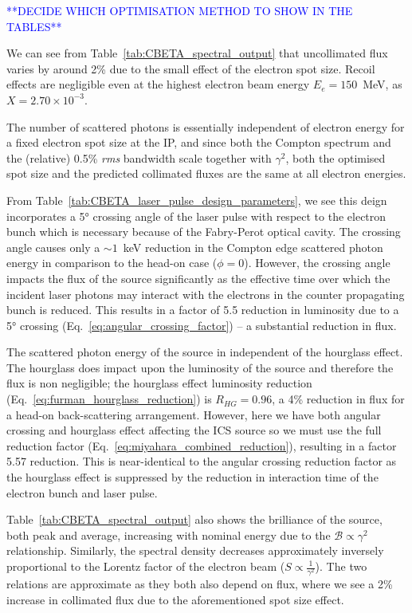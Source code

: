 \documentclass[../main.tex]{subfiles}
\begin{document}
\textcolor{blue}{**DECIDE WHICH OPTIMISATION METHOD TO SHOW IN THE TABLES**}

We can see from Table~\ref{tab:CBETA_spectral_output} that uncollimated flux varies by around 2\% due to the small effect of the electron spot size. Recoil effects are negligible even at the highest electron beam energy $E_{e} = 150$~\si{\mega\electronvolt}, as $X = 2.70\times 10^{-3}$.  

The number of scattered photons is essentially independent of electron energy for a fixed electron spot size at the IP, and since both the Compton spectrum and the (relative) 0.5\% \textit{rms} bandwidth scale together with $\gamma^2$, both the optimised spot size and the predicted collimated fluxes are the same at all electron energies.

From Table~\ref{tab:CBETA_laser_pulse_design_parameters}, we see this deign incorporates a 5\si{\degree} crossing angle of the laser pulse with respect to the electron bunch which is necessary because of the Fabry-Perot optical cavity. The crossing angle causes only a $\sim 1$~\si{\kilo\electronvolt} reduction in the Compton edge scattered photon energy in comparison to the head-on case ($\phi = 0$). However, the crossing angle impacts the flux of the source significantly as the effective time over which the incident laser photons may interact with the electrons in the counter propagating bunch is reduced. This results in a factor of 5.5 reduction in luminosity due to a 5\si{\degree} crossing (Eq.~\ref{eq:angular_crossing_factor}) -- a substantial reduction in flux. 

The scattered photon energy of the source in independent of the hourglass effect. The hourglass does impact upon the luminosity of the source and therefore the flux is non negligible; the hourglass effect luminosity reduction (Eq.~\ref{eq:furman_hourglass_reduction}) is $R_{HG} = 0.96$, a 4\% reduction in flux for a head-on back-scattering arrangement. However, here we have both angular crossing and hourglass effect affecting the ICS source so we must use the full reduction factor (Eq.~\ref{eq:miyahara_combined_reduction}), resulting in a factor 5.57 reduction. This is near-identical to the angular crossing reduction factor as the hourglass effect is suppressed by the reduction in interaction time of the electron bunch and laser pulse. 

Table~\ref{tab:CBETA_spectral_output} also shows the brilliance of the source, both peak and average, increasing with nominal energy due to the $\mathcal{B} \propto \gamma^{2}$ relationship. Similarly, the spectral density decreases approximately inversely proportional to the Lorentz factor of the electron beam ($S \propto \frac{1}{\gamma^{2}}$). The two relations are approximate as they both also depend on flux, where we see a 2\% increase in collimated flux due to the aforementioned spot size effect. 
\end{document}
